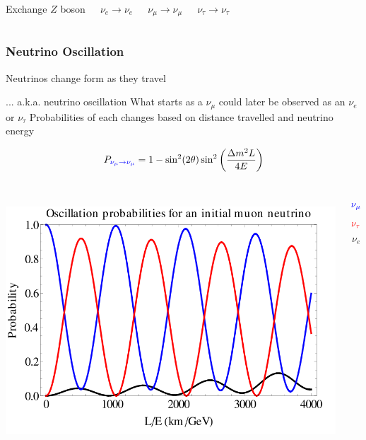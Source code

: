 \documentclass[10pt,professionalfonts,xcolor=table]{beamer}
\begin{document}
\begin{frame}
\begin{columns}
  \small
  Exchange $Z$ boson

  $\nu_e \rightarrow \nu_e$

  $\nu_\mu \rightarrow \nu_\mu$

  $\nu_\tau \rightarrow \nu_\tau$

  \end{columns}

\end{frame}

\frame
{
  \frametitle{Neutrino Oscillation}
  \begin{itemize}
  \bang Neutrinos change form as they travel
	  \begin{itemize}
	  \bing ... a.k.a. neutrino oscillation
	  \bing What starts as a $\nu_\mu$ could later be observed as an $\nu_e$ or $\nu_\tau$
	  \bing Probabilities of each changes based on distance travelled and neutrino energy
	  \end{itemize}
  \end{itemize}
\begin{center}
  \begin{equation*}
  P_{\color{blue}\nu_\mu \rightarrow \nu_\mu} = 1 - \sin^2(2\theta) \sin^2\bigg(\frac{\Delta m^2 L}{4 E}\bigg)
  \end{equation*}
\gap

  \begin{columns}[c]
    ~
  \includegraphics[width=1\textwidth]{figures/figures/osc_prob.png}
  \vspace{-70pt}

  \begin{equation*}
  \color{blue}
  \nu_\mu
  \end{equation*}
  \vspace{-20pt}
  \begin{equation*}
  \color{red}
  \nu_\tau
  \end{equation*}
  \vspace{-17pt}
  \begin{equation*}
  \nu_e
  \end{equation*}
  \gap
  ~

  \end{columns}


\end{center}


}
\end{document}
